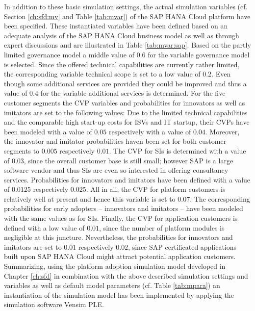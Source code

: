 In addition to these basic simulation settings, the actual simulation variables (cf. Section \ref{ch:sfd:mv} and Table \ref{tab:mvar}) of the SAP HANA Cloud platform have been specified. These instantiated variables have been defined based on an adequate analysis of the SAP HANA Cloud business model as well as through expert discussions and are illustrated in Table \ref{tab:mvar:sap}. Based on the partly limited governance model a middle value of $0.6$ for the variable governance model is selected. Since the offered technical capabilities are currently rather limited, the corresponding variable technical scope is set to a low value of $0.2$. Even though some additional services are provided they could be improved and thus a value of $0.4$ for the variable additional services is determined. For the five customer segments the \ac{CVP} variables and probabilities for innovators as well as imitators are set to the following values: Due to the limited technical capabilities and the comparable high start-up costs for \acp{ISV} and \ac{IT} startup, their \acp{CVP} have been modeled with a value of $0.05$ respectively with a value of $0.04$. Moreover, the innovator and imitator probabilities haven been set for both customer segments to $0.005$ respectively $0.01$. The \ac{CVP} for \acp{SI} is determined with a value of $0.03$, since the overall customer base is still small; however SAP is a large software vendor and thus \acp{SI} are even so interested in offering consultancy services. Probabilities for innovators and imitators have been defined with a value of $0.0125$ respectively $0.025$. All in all, the \ac{CVP} for platform customers is relatively well at present and hence this variable is set to $0.07$. The corresponding probabilities for early adopters -- innovators and imitators -- have been modeled with the same values as for \acp{SI}. Finally, the \ac{CVP} for application customers is defined with a low value of $0.01$, since the number of platform modules is negligible at this juncture. Nevertheless, the probabilities for innovators and imitators are set to $0.01$ respectively $0.02$, since SAP certificated applications built upon SAP HANA Cloud might attract potential application customers. Summarizing, using the platform adoption simulation model developed in Chapter \ref{ch:sfd} in combination with the above described simulation settings and variables as well as default model parameters (cf. Table \ref{tab:mpara}) an instantiation of the simulation model has been implemented by applying the simulation software Vensim \acs{PLE}.

